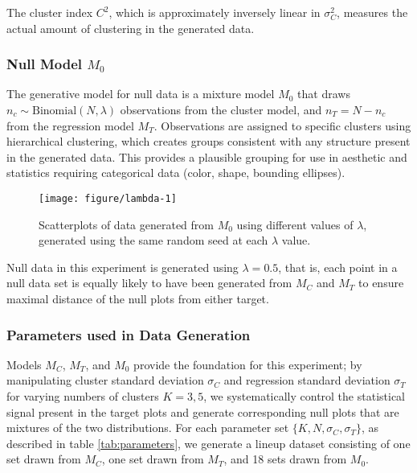 \documentclass[12pt]{article}\usepackage[]{graphicx}\usepackage[]{color}
\newenvironment{knitrout}{}{} %
\begin{document}
The cluster index $C^2$, which is approximately inversely linear in $\sigma_C^2$, measures the actual amount of clustering in the generated data.



\subsubsection{Null Model \texorpdfstring{$M_0$}{M0}}
The generative model for null data is a mixture model $M_0$ that draws $n_c \sim \text{Binomial}(N, \lambda)$ observations from the cluster model, and $n_T = N - n_c$ from the regression model $M_T$. Observations are assigned to specific clusters using hierarchical clustering, which creates groups consistent with any structure present in the generated data. This provides a plausible grouping for use in aesthetic and statistics requiring categorical data (color, shape, bounding ellipses). 

\begin{figure}[hbt]
\begin{knitrout}
\color{fgcolor}

{\centering \texttt{[image: figure/lambda-1]} 

}



\end{knitrout}
\caption[Mixing parameter for null model $M_0$]{\label{fig:lambda} Scatterplots of data generated from $M_0$ using different values of $\lambda$, generated using the same random seed at each $\lambda$ value.}
\end{figure}

Null data in this experiment is generated using $\lambda = 0.5$, that is, each point in a null data set is equally likely to have been generated from $M_C$ and $M_T$ to ensure maximal distance of the null plots from either target. 

\subsubsection{Parameters used in Data Generation}
Models $M_C$, $M_T$, and $M_0$ provide the foundation for this experiment; by manipulating cluster standard deviation $\sigma_C$ and regression standard deviation $\sigma_T$ for varying numbers of clusters $K=3, 5$, we  systematically control the statistical signal present in the target plots and generate corresponding null plots that are mixtures of the two distributions. For each parameter set $\{K, N, \sigma_C, \sigma_T\}$, as described in table \ref{tab:parameters}, we  generate a lineup dataset consisting of one set drawn from $M_C$, one set drawn from $M_T$, and 18 sets drawn from $M_0$. 
\end{document}
